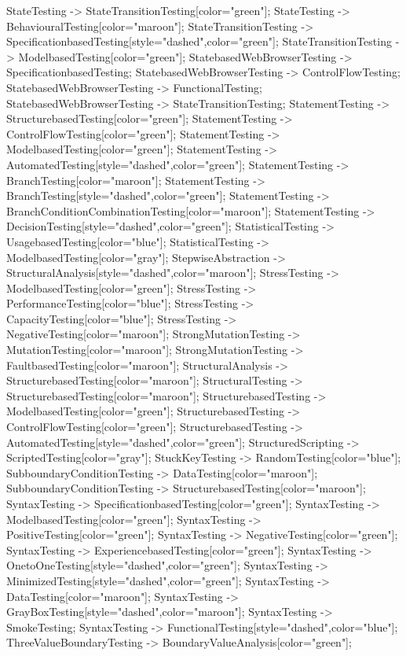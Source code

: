 \documentclass{article}
\begin{document}
{StateTesting -> StateTransitionTesting[color="green"];
StateTesting -> BehaviouralTesting[color="maroon"];
StateTransitionTesting -> SpecificationbasedTesting[style="dashed",color="green"];
StateTransitionTesting -> ModelbasedTesting[color="green"];
StatebasedWebBrowserTesting -> SpecificationbasedTesting;
StatebasedWebBrowserTesting -> ControlFlowTesting;
StatebasedWebBrowserTesting -> FunctionalTesting;
StatebasedWebBrowserTesting -> StateTransitionTesting;
StatementTesting -> StructurebasedTesting[color="green"];
StatementTesting -> ControlFlowTesting[color="green"];
StatementTesting -> ModelbasedTesting[color="green"];
StatementTesting -> AutomatedTesting[style="dashed",color="green"];
StatementTesting -> BranchTesting[color="maroon"];
StatementTesting -> BranchTesting[style="dashed",color="green"];
StatementTesting -> BranchConditionCombinationTesting[color="maroon"];
StatementTesting -> DecisionTesting[style="dashed",color="green"];
StatisticalTesting -> UsagebasedTesting[color="blue"];
StatisticalTesting -> ModelbasedTesting[color="gray"];
StepwiseAbstraction -> StructuralAnalysis[style="dashed",color="maroon"];
StressTesting -> ModelbasedTesting[color="green"];
StressTesting -> PerformanceTesting[color="blue"];
StressTesting -> CapacityTesting[color="blue"];
StressTesting -> NegativeTesting[color="maroon"];
StrongMutationTesting -> MutationTesting[color="maroon"];
StrongMutationTesting -> FaultbasedTesting[color="maroon"];
StructuralAnalysis -> StructurebasedTesting[color="maroon"];
StructuralTesting -> StructurebasedTesting[color="maroon"];
StructurebasedTesting -> ModelbasedTesting[color="green"];
StructurebasedTesting -> ControlFlowTesting[color="green"];
StructurebasedTesting -> AutomatedTesting[style="dashed",color="green"];
StructuredScripting -> ScriptedTesting[color="gray"];
StuckKeyTesting -> RandomTesting[color="blue"];
SubboundaryConditionTesting -> DataTesting[color="maroon"];
SubboundaryConditionTesting -> StructurebasedTesting[color="maroon"];
SyntaxTesting -> SpecificationbasedTesting[color="green"];
SyntaxTesting -> ModelbasedTesting[color="green"];
SyntaxTesting -> PositiveTesting[color="green"];
SyntaxTesting -> NegativeTesting[color="green"];
SyntaxTesting -> ExperiencebasedTesting[color="green"];
SyntaxTesting -> OnetoOneTesting[style="dashed",color="green"];
SyntaxTesting -> MinimizedTesting[style="dashed",color="green"];
SyntaxTesting -> DataTesting[color="maroon"];
SyntaxTesting -> GrayBoxTesting[style="dashed",color="maroon"];
SyntaxTesting -> SmokeTesting;
SyntaxTesting -> FunctionalTesting[style="dashed",color="blue"];
ThreeValueBoundaryTesting -> BoundaryValueAnalysis[color="green"];
}
\end{document}
